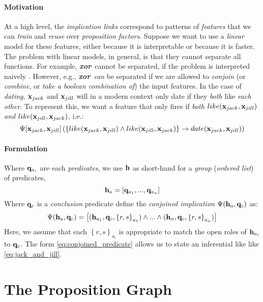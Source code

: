 \documentclass[11pt]{article}
\newcommand{\xvariable}{{\bf x}}
\newcommand{\qvariable}{{\bf q}}
\newcommand{\hvariable}{{\bf h}}
\newcommand{\xjack}{\xvariable_{jack}}
\newcommand{\xjill}{\xvariable_{jill}}
\newcommand{\opxor}{\textbf{\em xor}}
\begin{document}
\paragraph{Motivation}
At a high level, the {\em implication links} correspond to patterns of {\em features} that we can {\em train} and {\em reuse} over {\em proposition factors}.
Suppose we want to use a {\em linear} model for these features, either because it is interpretable or because it is faster.
The problem with linear models, in general, is that they cannot separate all functions.
For example, \opxor\ cannot be separated, if the problem is interpreted naively \cite{minsky1969perceptrons}. 
However, e.g., \opxor\ {\em can} be separated if we are allowed to {\em conjoin} (or {\em combine}, or {\em take a boolean combination of}) the input features.
In the case of {\em dating}, $\xjack$ and $\xjill$ will in a modern context only date if they {\em both} like {\em each other}.
To represent this, we want a feature that only fires if {\em both} $like(\xjack, \xjill)$ {\em and} $like(\xjill, \xjack)$, i.e.:
\begin{equation}
    \Psi[\xjack, \xjill]\left( \left\{like(\xjack, \xjill) \wedge like(\xjill, \xjack)\right\} \rightarrow date(\xjack, \xjill)\right)
    \label{eq:jack_and_jill}
\end{equation}

\paragraph{Formulation}
Where $\qvariable_{a_i}$ are each {\em predicates}, we use $\hvariable$ as short-hand for a {\em group} ({\em ordered list}) of predicates,
\[ \hvariable_a = [\qvariable_{a_1}, ..., \qvariable_{a_n}]\]
Where $\qvariable_c$ is a {\em conclusion} predicate define the {\em conjoined implication} $\Psi(\hvariable_a, \qvariable_c)$ as:
\begin{equation}
    \Psi(\hvariable_a, \qvariable_c) = \left[ (\hvariable_{a_1}, \qvariable_c, \left\{r, s\right\}_{a_1}) \wedge ... \wedge (\hvariable_n, \qvariable_c, \left\{r, s\right\}_{a_n})\right]
    \label{eq:conjoined_predicate}
\end{equation}
Here, we assume that each $\left\{r, s\right\}_{a_i}$ is appropriate to match the open roles of $\hvariable_{a_i}$ to $\qvariable_c$.
The form \ref{eq:conjoined_predicate} allows us to state an inferential like like \ref{eq:jack_and_jill}.

\section{The Proposition Graph}
\end{document}

